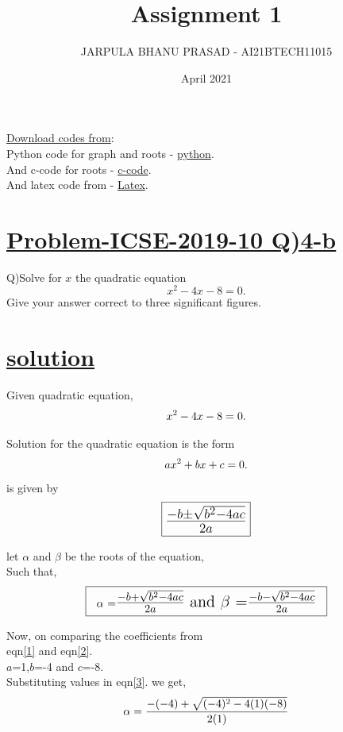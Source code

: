 \documentclass[journal,12pt,twocolumn]{IEEEtran}
\title{Assignment 1}
\author{JARPULA BHANU PRASAD - AI21BTECH11015	}
\date{April 2021}
\begin{document}
\maketitle
\Large \underline{Download codes from}:\\
\large Python code for graph and roots - \href{https://github.com/jarpula-Bhanu/Assinment-1/blob/main/codes/quardratic.py}{python}.\\And c-code for roots -  \href{https://github.com/jarpula-Bhanu/Assinment-1/blob/main/codes/roots.c}{c-code}.\\And latex code from - \href{https://github.com/jarpula-Bhanu/Assinment-1/blob/main/Assignment_1.tex}{Latex}.

\section{\Large \underline{Problem-ICSE-2019-10  Q)4-b}}
\large \noindent Q)Solve for $x$ the quadratic equation $$x^2-4x-8=0.$$ Give your answer correct to three significant figures.
\section{\large \underline{solution}}
Given quadratic equation,
\begin{align} \label{1}
\large x^2-4x-8=0.
\end{align}

\noindent Solution for the quadratic equation is the form 
\begin{align} \label{2}
 \large ax^2+bx+c=0.
\end{align} 
 is given by 
\begin{align*}
\framebox[1.1\width]{\LARGE $\frac{-b\pm\sqrt{b^2-4ac}}{2a}$}
\end{align*}

let $\alpha$ and $\beta$ be the roots of the equation,\\Such that,
\begin{align} \label{3}
\framebox[1.1\width]{$\alpha$ =\Large $\frac{-b+\sqrt{b^2-4ac}}{2a}$ and  $\beta$ =\Large $\frac{-b-\sqrt{b^2-4ac}}{2a}$}
\end{align}

Now, on comparing the coefficients from 
\\eqn\eqref{1} and eqn\eqref{2}.
\\\large $a$=1,\large $b$=-4 and \large $c$=-8.
\\Substituting values in eqn\eqref{3}. we get,
\begin{align} \label{4}
\alpha =\Large \frac{-(-4)+\sqrt{(-4)^2-4(1)(-8)}}{2(1)}
\end{align}
\end{document}
